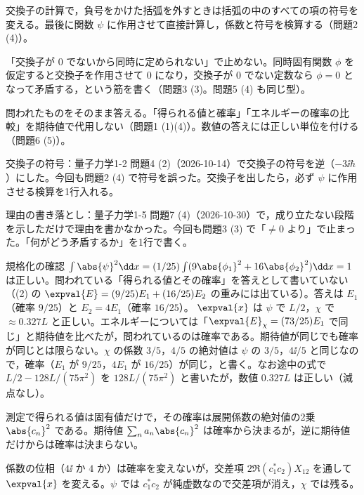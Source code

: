 \begin{daiji}
  \item 交換子の計算で，負号をかけた括弧を外すときは括弧の中のすべての項の符号を変える。最後に関数 $\psi$ に作用させて直接計算し，係数と符号を検算する（問題2 (4)）。
  \item 「交換子が $0$ でないから同時に定められない」で止めない。同時固有関数 $\phi$ を仮定すると交換子を作用させて $0$ になり，交換子が $0$ でない定数なら $\phi=0$ となって矛盾する，という筋を書く（問題3 (3)。問題5 (4) も同じ型）。
  \item 問われたものをそのまま答える。「得られる値と確率」「エネルギーの確率の比較」を期待値で代用しない（問題1 (1)(4)）。数値の答えには正しい単位を付ける（問題6 (5)）。
\end{daiji}
\begin{maemo}
  \item 交換子の符号：量子力学1-2 問題4 (2)（2026-10-14）で交換子の符号を逆（$-3\ii\hbar$）にした。今回も問題2 (4) で符号を誤った。交換子を出したら，必ず $\psi$ に作用させる検算を1行入れる。
  \item 理由の書き落とし：量子力学1-5 問題7 (4)（2026-10-30）で，成り立たない段階を示しただけで理由を書かなかった。今回も問題3 (3) で「$\ne 0$ より」で止まった。「何がどう矛盾するか」を1行で書く。
\end{maemo}
\begin{kotaeran}
   規格化の確認 $\int\abs{\psi}^{2}\dd x=(1/25)\int(9\abs{\phi_{1}}^{2}+16\abs{\phi_{2}}^{2})\dd x=1$ は正しい。問われている「得られる値とその確率」を答えとして書いていない（(2) の $\expval{E}=(9/25)E_{1}+(16/25)E_{2}$ の重みには出ている）。答えは $E_{1}$（確率 $9/25$）と $E_{2}=4E_{1}$（確率 $16/25$）。
   $\expval{x}$ は $\psi$ で $L/2$，$\chi$ で $\approx\num{0.327}L$ と正しい。エネルギーについては「$\expval{E}_{\chi}=(73/25)E_{1}$ で同じ」と期待値を比べたが，問われているのは確率である。期待値が同じでも確率が同じとは限らない。$\chi$ の係数 $3/5$，$4/5$ の絶対値は $\psi$ の $3/5$，$4\ii/5$ と同じなので，確率（$E_{1}$ が $9/25$，$4E_{1}$ が $16/25$）が同じ，と書く。なお途中の式で $L/2-128L/(75\pi^{2})$ を $128L/(75\pi^{2})$ と書いたが，数値 $\num{0.327}L$ は正しい（減点なし）。
\end{kotaeran}
\begin{rikai}
  \item 測定で得られる値は固有値だけで，その確率は展開係数の絶対値の2乗 $\abs{c_{n}}^{2}$ である。期待値 $\sum_{n}a_{n}\abs{c_{n}}^{2}$ は確率から決まるが，逆に期待値だけからは確率は決まらない。
  \item 係数の位相（$4\ii$ か $4$ か）は確率を変えないが，交差項 $2\Re(c_{1}^{*}c_{2})X_{12}$ を通して $\expval{x}$ を変える。$\psi$ では $c_{1}^{*}c_{2}$ が純虚数なので交差項が消え，$\chi$ では残る。
\end{rikai}
